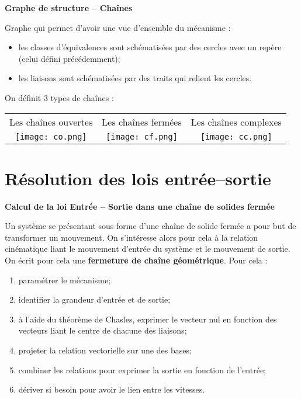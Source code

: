 \begin{defi}
\textbf{Graphe de structure -- Chaînes}

Graphe qui permet d'avoir une vue d'ensemble du mécanisme :
\begin{itemize}
\item les classes d'équivalences sont schématisées par des cercles avec un repère (celui défini précédemment);
\item les liaisons sont schématisées par des traits qui relient les cercles.
\end{itemize}

On définit 3 types de chaînes :
\begin{center}
\begin{tabular}{ccc}
Les chaînes ouvertes & Les chaînes fermées & Les chaînes complexes \\
\texttt{[image: co.png]}
&
\texttt{[image: cf.png]}
&
\texttt{[image: cc.png]}\\
\end{tabular}
\end{center}
\end{defi}


\section{Résolution des lois entrée--sortie}


\begin{methode}
\textbf{Calcul de la loi Entrée -- Sortie dans une chaîne de solides fermée}

Un système se présentant sous forme d'une chaîne de solide fermée a pour but de transformer un mouvement. On s'intéresse alors pour cela à la relation cinématique liant le mouvement d'entrée du système et le mouvement de sortie. On écrit pour cela une \textbf{fermeture de chaîne géométrique}. Pour cela :
\begin{enumerate}
\item paramétrer le mécanisme;
\item identifier la grandeur d'entrée et de sortie;
\item à l'aide du théorème de Chasles, exprimer le vecteur nul en fonction des vecteurs liant le centre de chacune des liaisons;
\item projeter la relation vectorielle sur une des bases;
\item combiner les relations pour exprimer la sortie en fonction de l'entrée;
\item dériver si besoin pour avoir le lien entre les vitesses. 
\end{enumerate}
\end{methode}


